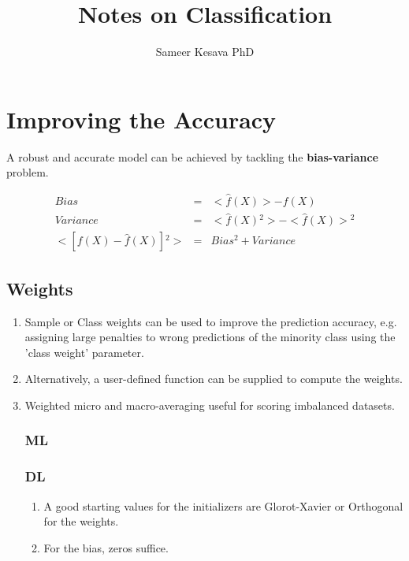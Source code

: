 \documentclass[a4paper, 12pt]{report}
\begin{document}
\title{Notes on Classification}
\author{Sameer Kesava PhD}
\maketitle

\tableofcontents
\newpage



\chapter{Improving the Accuracy}
A robust and accurate model can be achieved by tackling the \textbf{bias-variance} problem.

\begin{eqnarray}
Bias & = & <\hat{f}(X)> - f(X)\\
Variance & = & <\hat{f}(X){^{2}}> - <\hat{f}(X)>{^{2}}\\
<[f(X) - \hat{f}(X)]{^{2}}> & = & Bias{^{2}} + Variance
\end{eqnarray}

\section{Weights}
\label{sec:weights}
\begin{enumerate}
\item Sample or Class weights can be used to improve the prediction accuracy, e.g. assigning large penalties to wrong predictions of the minority class using the 'class weight' parameter.
\item Alternatively, a user-defined function can be supplied to compute the weights.
\item Weighted micro and macro-averaging useful for scoring imbalanced datasets.

\subsection{ML}

\subsection{DL}
\begin{enumerate}
\item A good starting values for the initializers are Glorot-Xavier or Orthogonal for the weights.
\item For the bias, zeros suffice.
\end{enumerate}
\end{enumerate}
\end{document}

